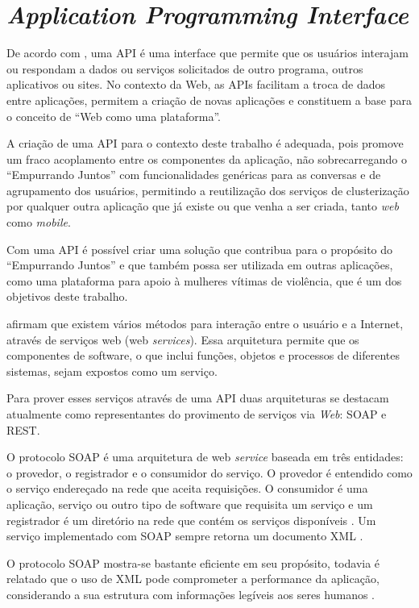 \chapter{\textit{Application Programming Interface}} \label{cap:api}

De acordo com , uma API é uma interface que permite que os 
usuários interajam ou respondam a dados ou serviços solicitados de outro programa, outros
aplicativos ou sites. No contexto da Web, as APIs facilitam a troca de dados entre 
aplicações, permitem a criação de novas aplicações e constituem a base para o conceito de 
``Web como uma plataforma''.

A criação de uma API para o contexto deste trabalho é adequada, pois promove um fraco acoplamento
entre os componentes da aplicação, não sobrecarregando o ``Empurrando Juntos'' com funcionalidades genéricas
para as conversas e de agrupamento dos usuários,
permitindo a reutilização dos serviços de clusterização por qualquer
outra aplicação que já existe ou que venha a ser criada, tanto \textit{web} como \textit{mobile}.

Com uma API é possível criar uma solução que contribua para o propósito do ``Empurrando Juntos'' e que também
possa ser utilizada em outras aplicações, como uma plataforma para apoio à mulheres vítimas de violência, que é
um dos objetivos deste trabalho.

 afirmam que existem vários métodos para interação entre o  
usuário e a Internet, através de serviços web (web \textit{services}).
Essa arquitetura permite que os componentes de software, o que inclui funções,
objetos e processos de diferentes sistemas, sejam expostos como um serviço.

Para prover esses serviços através de uma API duas arquiteturas se destacam atualmente como representantes do provimento
de serviços via \textit{Web}: SOAP e REST.

O protocolo SOAP é uma arquitetura de web \textit{service} baseada em três entidades: o provedor, o registrador e o consumidor do serviço.
O provedor é entendido como o serviço endereçado na rede
que aceita requisições. O consumidor é uma aplicação, serviço ou outro tipo de software que
requisita um serviço e um registrador é um diretório na rede que contém os serviços disponíveis \cite{mumbaikar}.
Um serviço implementado com SOAP sempre retorna um documento XML \cite{wagh2012comparative}.

O protocolo SOAP mostra-se bastante eficiente em seu propósito, 
todavia é relatado que o uso de XML pode comprometer a performance da aplicação, considerando a sua estrutura com informações 
legíveis aos seres humanos \cite{wagh2012comparative, soap_and_ws}.


